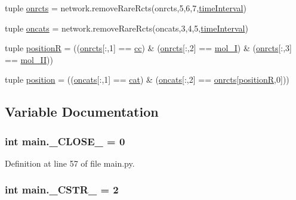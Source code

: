 \begin{DoxyCompactItemize}
\item 
tuple \hyperlink{a00117_ab26ffc3eda5d201a779d705813b06348}{onrcts} = network.\-remove\-Rare\-Rcts(onrcts,5,6,7,\hyperlink{a00117_a5ba0cd0b7538ed8047b2fea322ecb4b7}{time\-Interval})
\item 
tuple \hyperlink{a00117_ab4d380bc4bfcb970acc39ddf18a73972}{oncats} = network.\-remove\-Rare\-Rcts(oncats,3,4,5,\hyperlink{a00117_a5ba0cd0b7538ed8047b2fea322ecb4b7}{time\-Interval})
\item 
tuple \hyperlink{a00117_adbbdc0f6ad0f08400b3e492f7a807a6b}{position\-R} = ((\hyperlink{a00117_ab26ffc3eda5d201a779d705813b06348}{onrcts}\mbox{[}\-:,1\mbox{]} == \hyperlink{a00028_afb5980388a6e55ca55437b53cdaf528a}{cc}) \& (\hyperlink{a00117_ab26ffc3eda5d201a779d705813b06348}{onrcts}\mbox{[}\-:,2\mbox{]} == \hyperlink{a00028_ab346189eef5359a07ba32144ddcd4465}{mol\-\_\-\-I}) \& (\hyperlink{a00117_ab26ffc3eda5d201a779d705813b06348}{onrcts}\mbox{[}\-:,3\mbox{]} == \hyperlink{a00028_a4d2c086887289f8900b38ffa56854da3}{mol\-\_\-\-I\-I}))
\item 
tuple \hyperlink{a00117_ac67c60df3cc9afae7e4888d2b48b846d}{position} = ((\hyperlink{a00117_ab4d380bc4bfcb970acc39ddf18a73972}{oncats}\mbox{[}\-:,1\mbox{]} == \hyperlink{a00028_a7073f71a43389f3032e69b1fffc2551a}{cat}) \& (\hyperlink{a00117_ab4d380bc4bfcb970acc39ddf18a73972}{oncats}\mbox{[}\-:,2\mbox{]} == \hyperlink{a00117_ab26ffc3eda5d201a779d705813b06348}{onrcts}\mbox{[}\hyperlink{a00117_adbbdc0f6ad0f08400b3e492f7a807a6b}{position\-R},0\mbox{]}))
\end{DoxyCompactItemize}


\subsection{Variable Documentation}
\hypertarget{a00117_a05832bb8aa5b5b63ca022653c9b32af5}{
\subsubsection[{\-\_\-\-C\-L\-O\-S\-E\-\_\-}]{\setlength{\rightskip}{0pt plus 5cm}int main.\-\_\-\-C\-L\-O\-S\-E\-\_\- = 0}}\label{a00117_a05832bb8aa5b5b63ca022653c9b32af5}


Definition at line 57 of file main.\-py.

\hypertarget{a00117_a4994448f45a50087ae8864153ab89e10}{
\subsubsection[{\-\_\-\-C\-S\-T\-R\-\_\-}]{\setlength{\rightskip}{0pt plus 5cm}int main.\-\_\-\-C\-S\-T\-R\-\_\- = 2}}\label{a00117_a4994448f45a50087ae8864153ab89e10}



